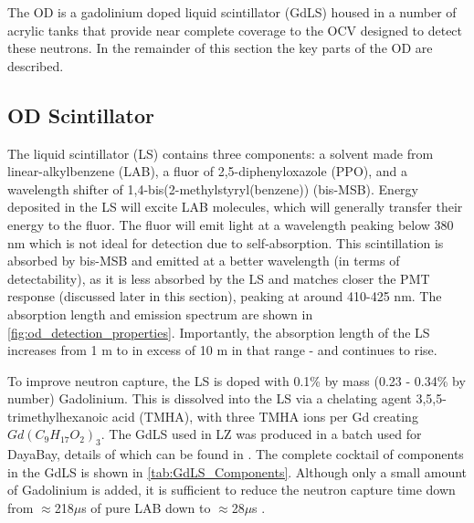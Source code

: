 

\par
The OD is a gadolinium doped liquid scintillator (GdLS) housed in a number of acrylic tanks that provide near complete coverage to the OCV designed to detect these neutrons.
In the remainder of this section the key parts of the OD are described.

\subsection{OD Scintillator}
\par
The liquid scintillator (LS) contains three components: a solvent made from linear-alkylbenzene (LAB), a fluor of 2,5-diphenyloxazole (PPO), and a wavelength shifter of 1,4-bis(2-methylstyryl(benzene)) (bis-MSB).
Energy deposited in the LS will excite LAB molecules, which will generally transfer their energy to the fluor. 
The fluor will emit light at a wavelength peaking below 380 nm which is not ideal for detection due to self-absorption.
This scintillation is absorbed by bis-MSB and emitted at a better wavelength (in terms of detectability), as it is less absorbed by the LS and matches closer the PMT response (discussed later in this section), peaking at around 410-425 nm.
The absorption length and emission spectrum are shown in \autoref{fig:od_detection_properties}.
Importantly, the absorption length of the LS increases from 1 m to in excess of 10 m in that range - and continues to rise.



\par
To improve neutron capture, the LS is doped with 0.1\% by mass (0.23 - 0.34\% by number) Gadolinium.
This is dissolved into the LS via a chelating agent 3,5,5-trimethylhexanoic acid (TMHA), with three TMHA ions per Gd creating $Gd({C}_{9}{H}_{17}{O}_{2})_{3}$.
The GdLS used in LZ was produced in a batch used for DayaBay, details of which can be found in \cite{dayabay_gd_doping_ref}.
The complete cocktail of components in the GdLS is shown in \autoref{tab:GdLS_Components}.
Although only a small amount of Gadolinium is added, it is sufficient to reduce the neutron capture time down from $\approx$218$\mu$s of pure LAB down to $\approx$28$\mu$s \cite{ucsb_gdls_dicebox_simulations_ref}.

